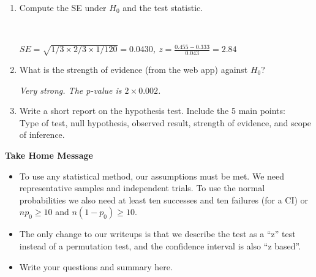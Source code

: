 \begin{enumerate}
\begin{key} 
{\it $H_0: p = 1/3$, versus $H_a:  p \neq 1/3$}
\end{key}
 
\item Compute the SE under $H_0$ and the test statistic.
\begin{students}
    \vspace{1cm}    \\
\end{students}

\begin{key} 
{\it $SE = \sqrt{1/3 \times 2/3 \times 1/120} =0.0430$, $z = \frac{0.455 - 0.333}{0.043} = 2.84$}
\end{key}


\item What is the strength of evidence (from the web app) against   $H_0$?  
\begin{students}
       \vspace{3.5cm}
\end{students}

\begin{key} 
{\it Very strong.  The p-value is $2 \times 0.002$. }
\end{key}

\item Write a short report on the hypothesis test. Include the 5 main
  points:\\
  Type of test, null hypothesis, observed result, strength of
  evidence, and scope of inference. \vfill

\end{enumerate}



\begin{center}
  {\large\bf Take Home Message}
\end{center}
 
\begin{itemize}
\item To use any statistical method, our assumptions must be met. We
  need representative samples and independent trials.%
  To use the normal
  probabilities we also need at least ten successes and ten failures
  (for a CI) or $np_0 \geq 10$ and $n(1-p_0) \geq 10$.  
\item The only change to our writeups is that we describe the test as
  a ``z'' test instead of a permutation test, and the confidence
  interval is also ``z based''.
\item Write your questions and summary here.

\end{itemize}\vspace*{1in}



